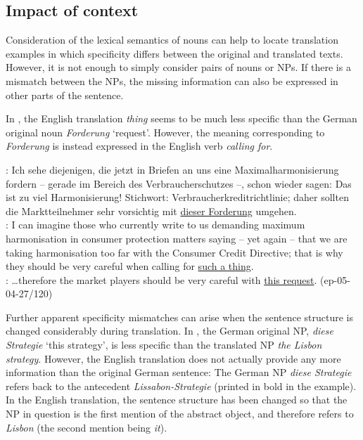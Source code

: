 \documentclass[output=paper]{LSP/langsci}
\begin{document}
\subsection{Impact of context}
\label{sec:context}
Consideration of the lexical semantics of nouns can help to locate translation examples in which specificity differs between the original and translated texts. However, it is not enough to simply consider pairs of nouns or NPs. If there is a mismatch between the NPs, the missing information can also be expressed in other parts of the sentence. 

In , the English translation {\it thing} seems to be much less specific than the German original noun {\it Forderung} `request'. However, the meaning corresponding to {\it Forderung} is instead expressed in the English verb {\it calling for}.


\ea	\label{ex:forderung}
\DEo : %
Ich sehe diejenigen, die jetzt in Briefen an uns eine Maximalharmonisierung fordern -- gerade im Bereich des Verbraucherschutzes --, schon wieder sagen: Das ist zu viel Harmonisierung! Stichwort: Verbraucherkreditrichtlinie; daher sollten die Marktteilnehmer sehr vorsichtig mit \ul{dieser Forderung} umgehen.\\
\ENt : %
I can imagine those who currently write to us demanding maximum harmonisation in consumer protection matters saying -- yet again -- that we are taking harmonisation too far with the Consumer Credit Directive; that is why they should be very careful when calling for \ul{such a thing}.\\
\DElit : \dots therefore the market players should be very careful with \ul{this request}. \hfill{(ep-05-04-27/120)}
\z

Further apparent specificity mismatches can arise when the sentence structure is changed considerably during translation. In , the German original NP, {\it diese Strategie} `this strategy', is less specific than the translated NP {\it the Lisbon strategy}. However, the English translation does not actually provide any more information than the original German sentence: The German NP {\it diese Strategie} refers back to the antecedent  {\it Lissabon-Strategie} (printed in bold in the example). In the English translation, the sentence structure has been changed so that the NP in question is the first mention of the abstract object, and therefore refers to {\it Lisbon} (the second mention being \textit{it}). 
\end{document}
